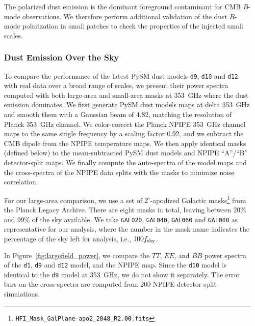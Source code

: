 \documentclass[twocolumn]{aastex631}
\begin{document}
The polarized dust emission is the dominant foreground contaminant for CMB $B$-mode observations. We therefore perform additional validation of the dust $B$-mode polarization in small patches to check the properties of the injected small scales. 

\subsubsection{Dust Emission Over the Sky} 
\label{sec:dust_validation}
To compare the performance of the latest PySM dust models \texttt{d9}, \texttt{d10} and \texttt{d12} with real data over a broad range of scales, we present their power spectra computed with both large-area and small-area masks at 353~GHz where the dust emission dominates. We first generate PySM dust models maps at delta 353~GHz and smooth them with a Gaussian beam of 4.82\arcmin, matching the resolution of Planck 353~GHz channel. We color-correct the Planck NPIPE 353~GHz channel maps to the same single frequency by a scaling factor 0.92, and we subtract the CMB dipole from the NPIPE temperature maps. We then apply identical masks (defined below) to the mean-subtracted PySM dust models and NPIPE ``A''/``B'' detector-split maps. We finally compute the auto-spectra of the model maps and the cross-spectra of the NPIPE data splits with the masks to minimize noise correlation. 

For our large-area comparison, we use a set of $2^\circ$-apodized Galactic masks\footnote{\texttt{HFI\_Mask\_GalPlane-apo2\_2048\_R2.00.fits}} from the Planck Legacy Archive. There are eight masks in total, leaving between 20\% and 99\% of the sky available. We take \texttt{GAL020}, \texttt{GAL040}, \texttt{GAL060} and \texttt{GAL080} as representative for our analysis, where the number in the mask name indicates the percentage of the sky left for analysis, i.e., $100 f_{\rm sky}$.

In Figure~\ref{fig:largefield_power}, we compare the $TT$, $EE$, and $BB$ power spectra of the \texttt{d1}, \texttt{d9} and \texttt{d12} model, and the NPIPE map. Since the \texttt{d10} model is identical to the \texttt{d9} model at 353~GHz, we do not show it separately. The error bars on the cross-spectra are computed from 200 NPIPE detector-split simulations.
\end{document}
